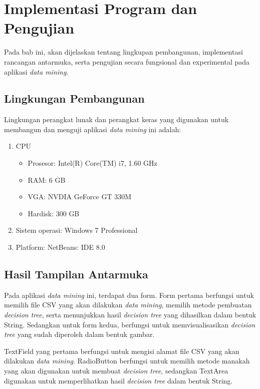 \chapter{Implementasi Program dan Pengujian}

Pada bab ini, akan dijelaskan tentang lingkupan pembangunan, implementasi rancangan antarmuka, serta pengujian secara fungsional dan experimental pada aplikasi \textsl{data mining}.

\section{Lingkungan Pembangunan}
Lingkungan perangkat lunak dan perangkat keras yang digunakan untuk membangun dan menguji aplikasi \textsl{data mining} ini adalah:

\begin{enumerate}
	\item CPU
	\begin{itemize}
		\item Prosesor: Intel(R) Core(TM) i7, 1.60 GHz
		\item RAM: 6 GB
		\item VGA: NVDIA GeForce GT 330M
		\item Hardisk: 300 GB
	\end{itemize}
	\item Sistem operasi: Windows 7 Professional
	\item Platform: NetBeans: IDE 8.0
\end{enumerate}

\section{Hasil Tampilan Antarmuka}
Pada aplikasi \textsl{data mining} ini, terdapat dua form. Form pertama berfungsi untuk memilih file CSV yang akan dilakukan \textsl{data mining}, memilih metode pembuatan \textsl{decision tree}, serta menunjukkan hasil \textsl{decision tree} yang dihasilkan dalam bentuk String. Sedangkan untuk form kedua, berfungsi untuk memvisualisasikan \textsl{decision tree} yang sudah diperoleh dalam bentuk gambar.

TextField yang pertama berfungsi untuk mengisi alamat file CSV yang akan dilakukan \textsl{data mining}. RadioButton berfungsi untuk memilih metode manakah yang akan digunakan untuk membuat \textsl{decision tree}, sedangkan TextArea digunakan untuk memperlihatkan hasil \textsl{decision tree} dalam bentuk String.

